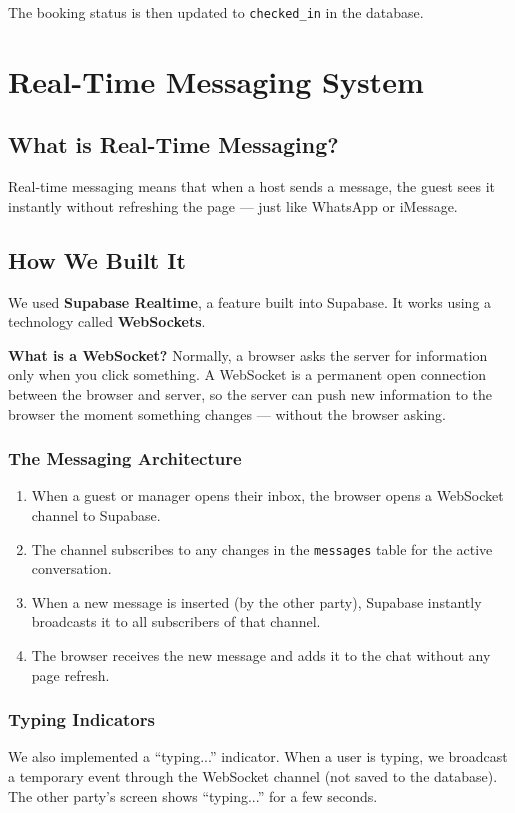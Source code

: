 \documentclass[12pt,a4paper]{article}
\begin{document}
The booking status is then updated to \texttt{checked\_in} in the database.

\newpage
\section{Real-Time Messaging System}

\subsection{What is Real-Time Messaging?}
Real-time messaging means that when a host sends a message, the guest sees it instantly without refreshing the page --- just like WhatsApp or iMessage.

\subsection{How We Built It}

We used \textbf{Supabase Realtime}, a feature built into Supabase. It works using a technology called \textbf{WebSockets}.

\begin{notebox}
\textbf{What is a WebSocket?} Normally, a browser asks the server for information only when you click something. A WebSocket is a permanent open connection between the browser and server, so the server can push new information to the browser the moment something changes --- without the browser asking.
\end{notebox}

\subsubsection{The Messaging Architecture}

\begin{enumerate}
  \item When a guest or manager opens their inbox, the browser opens a WebSocket channel to Supabase.
  \item The channel subscribes to any changes in the \texttt{messages} table for the active conversation.
  \item When a new message is inserted (by the other party), Supabase instantly broadcasts it to all subscribers of that channel.
  \item The browser receives the new message and adds it to the chat without any page refresh.
\end{enumerate}

\subsubsection{Typing Indicators}
We also implemented a ``typing...'' indicator. When a user is typing, we broadcast a temporary event through the WebSocket channel (not saved to the database). The other party's screen shows ``typing...'' for a few seconds.
\end{document}
